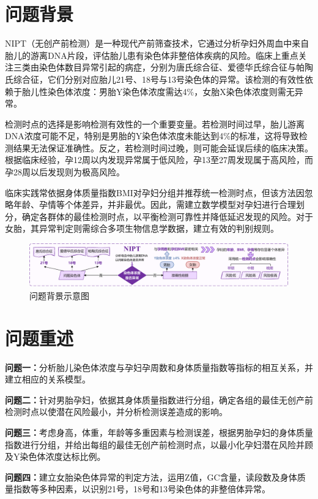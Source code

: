 \section{问题背景}


NIPT（无创产前检测）是一种现代产前筛查技术，它通过分析孕妇外周血中来自胎儿的游离DNA片段，评估胎儿患有染色体非整倍体疾病的风险。临床上重点关注三类由染色体数目异常引起的病症，分别为唐氏综合征、爱德华氏综合征与帕陶氏综合征，它们分别对应胎儿21号、18号与13号染色体的异常。该检测的有效性依赖于胎儿性染色体浓度：男胎Y染色体浓度需达4\%，女胎X染色体浓度则需无异常。

检测时点的选择是影响检测有效性的一个重要变量。若检测时间过早，胎儿游离DNA浓度可能不足，特别是男胎的Y染色体浓度未能达到4\%的标准，这将导致检测结果无法保证准确性。反之，若检测时间过晚，则可能会延误后续的临床决策。根据临床经验，孕12周以内发现异常属于低风险，孕13至27周发现属于高风险，而孕28周以后发现则为极高风险。

临床实践常依据身体质量指数BMI对孕妇分组并推荐统一检测时点，但该方法因忽略年龄、孕情等个体差异，并非最优。因此，需建立数学模型对孕妇进行合理划分，确定各群体的最佳检测时点，以平衡检测可靠性并降低延迟发现的风险。对于女胎，其异常判定则需综合多项生物信息学数据，建立有效的判别规则。


\begin{figure}[H]
	\centering
	\includegraphics[width=\textwidth]{figs/1前置/问题背景.pdf}
	\caption{问题背景示意图}
\end{figure}

\section{问题重述}

\textbf{问题一：}分析胎儿染色体浓度与孕妇孕周数和身体质量指数等指标的相互关系，并建立相应的关系模型。

\textbf{问题二：}针对男胎孕妇，依据其身体质量指数进行分组，确定各组的最佳无创产前检测时点以使潜在风险最小，并分析检测误差造成的影响。

\textbf{问题三：}考虑身高，体重，年龄等多重因素与检测误差，根据男胎孕妇的身体质量指数进行分组，并给出每组的最佳无创产前检测时点，以最小化孕妇潜在风险并顾及Y染色体浓度达标比例。

\textbf{问题四：}建立女胎染色体异常的判定方法，运用Z值，GC含量，读段数及身体质量指数等多种因素，以识别21号，18号和13号染色体的非整倍体异常。


